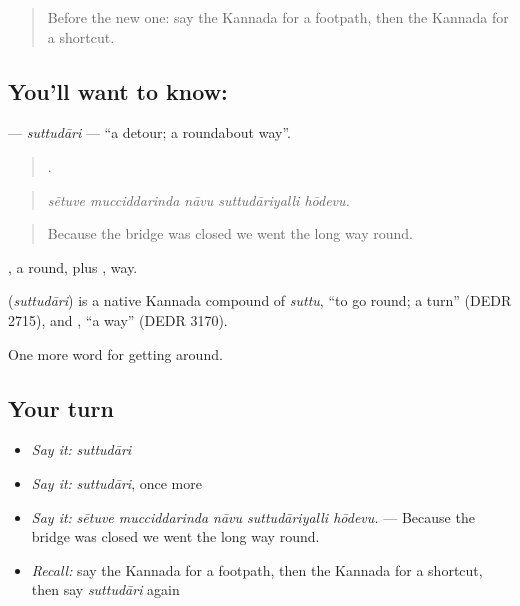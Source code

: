\label{lesson:KA-C446-suttudari}



\begin{quote}
Before the new one: say the Kannada for a footpath, then the Kannada for a shortcut.
\end{quote}

\subsection*{You'll want to know: }
\textbf{} — \emph{suttudāri} — \textquotedblleft{}a detour; a roundabout way\textquotedblright{}.

\begin{quote}
    .
\end{quote}

\begin{quote}
\emph{sētuve mucciddarinda nāvu suttudāriyalli hōdevu.}
\end{quote}

\begin{quote}
Because the bridge was closed we went the long way round.
\end{quote}

, a round, plus , way.

\begin{cousinweb}
\textbf{} (\emph{suttudāri}) is a native Kannada compound of \emph{suttu}, \textquotedblleft{}to go round; a turn\textquotedblright{} (DEDR 2715), and , \textquotedblleft{}a way\textquotedblright{} (DEDR 3170).
\end{cousinweb}

\begin{grammarlens}[title={What you've built}]
One more word for getting around.
\end{grammarlens}

\subsection*{Your turn}
\begin{itemize}
\raggedright
  \item \emph{Say it:} \emph{suttudāri}
  \item \emph{Say it:} \emph{suttudāri}, once more
  \item \emph{Say it:} \emph{sētuve mucciddarinda nāvu suttudāriyalli hōdevu.} — Because the bridge was closed we went the long way round.
  \item \emph{Recall:} say the Kannada for a footpath, then the Kannada for a shortcut, then say \emph{suttudāri} again
\end{itemize}

